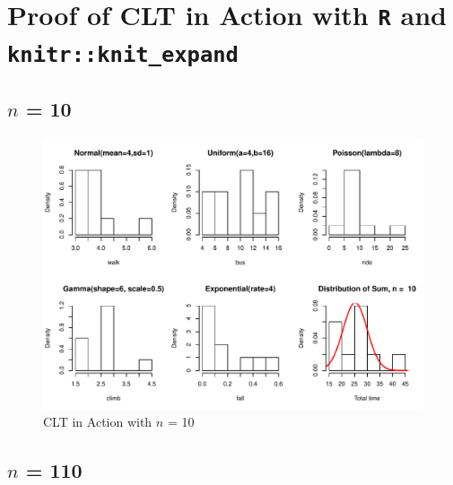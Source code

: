 \documentclass[11pt,letter]{article}\usepackage[]{graphicx}\usepackage[]{color}
\makeatletter
\def\maxwidth{ %
  \ifdim\Gin@nat@width>\linewidth
    \linewidth
  \else
    \Gin@nat@width
  \fi
}
\newenvironment{knitrout}{}{} %
\makeatother
\begin{document}
\FloatBarrier

\section{Proof of CLT in Action with \texttt{R} and \texttt{knitr::knit\_expand}}





\newpage
\subsection{$n$ = 10}

\begin{knitrout}
\color{fgcolor}\begin{figure}[h]

{\centering \includegraphics[width=\maxwidth]{figure/n-10-1} 

}

\caption[CLT in Action with ]{CLT in Action with $n$ = 10}\label{fig:n-10}
\end{figure}


\end{knitrout}
\newpage
\subsection{$n$ = 110}
\end{document}
